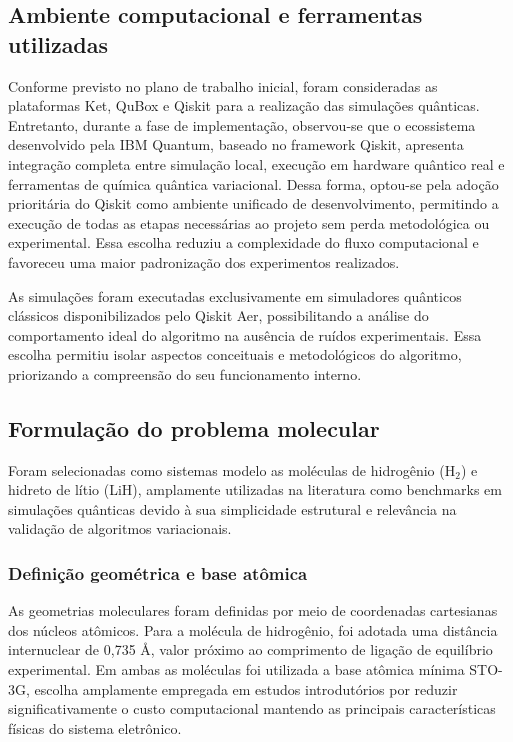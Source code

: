 \subsection{Ambiente computacional e ferramentas utilizadas}

Conforme previsto no plano de trabalho inicial, foram consideradas as 
plataformas Ket, QuBox e Qiskit para a realização das simulações quânticas. 
Entretanto, durante a fase de implementação, observou-se que o ecossistema 
desenvolvido pela IBM Quantum, baseado no framework Qiskit, apresenta 
integração completa entre simulação local, execução em hardware quântico 
real e ferramentas de química quântica variacional.
Dessa forma, optou-se pela adoção prioritária do Qiskit como ambiente 
unificado de desenvolvimento, permitindo a execução de todas as etapas 
necessárias ao projeto sem perda metodológica ou experimental. Essa escolha 
reduziu a complexidade do fluxo computacional e favoreceu uma maior 
padronização dos experimentos realizados.

As simulações foram executadas exclusivamente em simuladores quânticos
clássicos disponibilizados pelo Qiskit Aer, possibilitando a análise
do comportamento ideal do algoritmo na ausência de ruídos experimentais.
Essa escolha permitiu isolar aspectos conceituais e metodológicos do
algoritmo, priorizando a compreensão do seu funcionamento interno.

\subsection{Formulação do problema molecular}

Foram selecionadas como sistemas modelo as moléculas de hidrogênio (H$_2$) e 
hidreto de lítio (LiH), amplamente utilizadas na literatura como benchmarks 
em simulações quânticas devido à sua simplicidade estrutural e relevância na 
validação de algoritmos variacionais.

\subsubsection{Definição geométrica e base atômica}

As geometrias moleculares foram definidas por meio de coordenadas 
cartesianas dos núcleos atômicos. Para a molécula de hidrogênio, foi adotada 
uma distância internuclear de 0,735 Å, valor próximo ao comprimento de 
ligação de equilíbrio experimental. 
Em ambas as moléculas foi utilizada a base atômica mínima STO-3G, escolha 
amplamente empregada em estudos introdutórios por reduzir significativamente 
o custo computacional mantendo as principais características físicas do 
sistema eletrônico.

